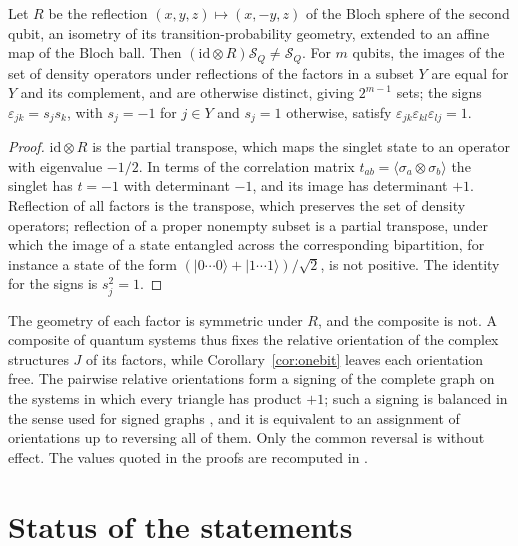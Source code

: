 \begin{proposition}\label{prop:orient}
Let $R$ be the reflection $(x,y,z)\mapsto(x,-y,z)$ of the Bloch sphere of the second qubit, an isometry of its transition-probability geometry, extended to an affine map of the Bloch ball. Then $(\mathrm{id}\otimes R)\mathcal{S}_Q\ne\mathcal{S}_Q$. For $m$ qubits, the images of the set of density operators under reflections of the factors in a subset $Y$ are equal for $Y$ and its complement, and are otherwise distinct, giving $2^{m-1}$ sets; the signs $\varepsilon_{jk}=s_js_k$, with $s_j=-1$ for $j\in Y$ and $s_j=1$ otherwise, satisfy $\varepsilon_{jk}\varepsilon_{kl}\varepsilon_{lj}=1$.
\end{proposition}
\begin{proof}
$\mathrm{id}\otimes R$ is the partial transpose, which maps the singlet state to an operator with eigenvalue $-1/2$. In terms of the correlation matrix $t_{ab}=\langle\sigma_a\otimes\sigma_b\rangle$ the singlet has $t=-1$ with determinant $-1$, and its image has determinant $+1$. Reflection of all factors is the transpose, which preserves the set of density operators; reflection of a proper nonempty subset is a partial transpose, under which the image of a state entangled across the corresponding bipartition, for instance a state of the form $(|0\cdots0\rangle+|1\cdots1\rangle)/\sqrt2$, is not positive. The identity for the signs is $s_j^2=1$.
\end{proof}
The geometry of each factor is symmetric under $R$, and the composite is not. A composite of quantum systems thus fixes the relative orientation of the complex structures $J$ of its factors, while Corollary~\ref{cor:onebit} leaves each orientation free. The pairwise relative orientations form a signing of the complete graph on the systems in which every triangle has product $+1$; such a signing is balanced in the sense used for signed graphs \cite{g3}, and it is equivalent to an assignment of orientations up to reversing all of them. Only the common reversal is without effect. The values quoted in the proofs are recomputed in \cite{comp2}.

\section{Status of the statements}\label{sec:status}


